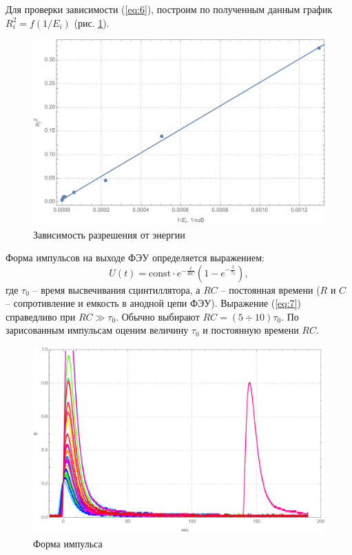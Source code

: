 \documentclass[a4paper, 12pt]{article}
\begin{document}
Для проверки зависимости (\ref{eq:6}), построим по полученным данным график $R_i^2=f\left(1/E_i\right)$ (рис. \ref{fig:re}).
\begin{figure}[!htb]
\centering
\includegraphics[scale=0.7]{Re.pdf}
\caption{Зависимость разрешения от энергии}
\label{fig:re}
\end{figure}
\par
Форма импульсов на выходе ФЭУ определяется выражением:
\begin{equation}
U(t)=\text{const}\cdot e^{-\frac{t}{RC}}\left(1-e^{-\frac{t}{\tau_0}}\right),
\label{eq:7}
\end{equation}
где $\tau_0$ -- время высвечивания сцинтиллятора, а $RC$ -- постоянная времени ($R$ и $C$ -- сопротивление и емкость в анодной цепи ФЭУ). Выражение (\ref{eq:7}) справедливо при $RC\gg\tau_0$. Обычно выбирают $RC=(5\div 10)\tau_0$. По зарисованным импульсам оценим величину $\tau_0$ и постоянную времени $RC$.
\begin{figure}[!htb]
\centering
\includegraphics[scale=0.7]{oscil.pdf}
\caption{Форма импульса}
\end{figure}
\end{document}
